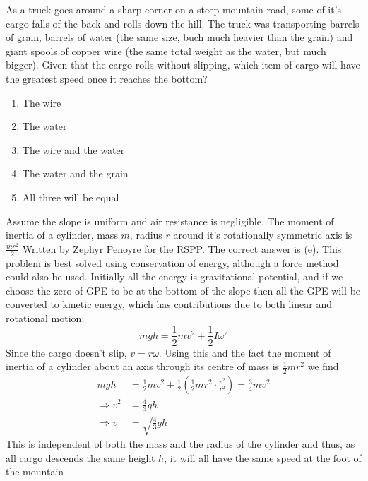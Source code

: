 \begin{hint}
{As a truck goes around a sharp corner on a steep mountain road, some of it's cargo falls of the back and rolls down the hill. The truck was transporting barrels of grain, barrels of water (the same size, buch much heavier than the grain) and giant spools of copper wire (the same total weight as the water, but much bigger). Given that the cargo rolls without slipping, which item of cargo will have the greatest speed once it reaches the bottom?
\begin{enumerate}
	\item The wire
	\item The water
	\item The wire and the water
	\item The water and the grain
	\item All three will be equal
\end{enumerate}
  }
{Assume the slope is uniform and air resistance is negligible. The moment of inertia of a cylinder, mass $m$, radius $r$ around it's rotationally symmetric axis is $\frac{m r^2}{2}$}
{Written by Zephyr Penoyre for the RSPP.}
{The correct answer is (e).
This problem is best solved using conservation of energy, although a force method could also be used. Initially all the energy is gravitational potential, and if we choose the zero of GPE to be at the bottom of the slope then all the GPE will be converted to kinetic energy, which has contributions due to both linear and rotational motion:
\begin{equation*}
mgh=\frac{1}{2}mv^2+\frac{1}{2}I\omega^2
\end{equation*}
Since the cargo doesn't slip, $v=r\omega$. Using this and the fact the moment of inertia of a cylinder about an axis through its centre of mass is $\frac{1}{2}mr^2$ we find
\begin{align*}
mgh&=\frac{1}{2}mv^2+\frac{1}{2}\left(\frac{1}{2}mr^2\cdot \frac{v^2}{r^2}\right)=\frac{3}{4}mv^2 \\
\Rightarrow v^2&=\frac{4}{3}gh \\
\Rightarrow v&=\sqrt{\frac{4}{3}gh}
\end{align*}
This is independent of both the mass and the radius of the cylinder and thus, as all cargo descends the same height $h$, it will all have the same speed at the foot of the mountain
}
\end{hint}